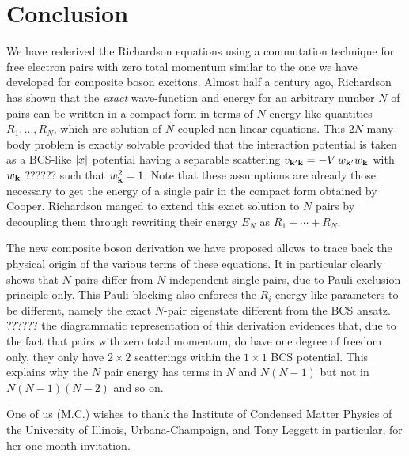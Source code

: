 \section{Conclusion}
We have rederived the Richardson equations using a commutation technique for free electron pairs with zero total momentum similar to the one we have developed for composite boson excitons.  Almost half a century ago, Richardson has shown that the \emph{exact} wave-function and energy for an arbitrary number $N$ of pairs can be written in a compact form in terms of $N$ energy-like quantities $R_1,..., R_N$, which are solution of $N$ coupled non-linear equations.  This $2N$ many-body problem is exactly solvable provided that the interaction potential is taken as a BCS-like $\lvert{x}\rvert$ potential having a separable scattering $v_{\mathbf{k}'\mathbf{k}}=-V\,w_{\mathbf{k}'}w_{\mathbf{k}}$ with $w_{\mathbf{k}}$ ?????? such that $w_{\mathbf{k}}^2=1$.  Note that these assumptions are already those necessary to get the energy of a single pair in the compact form obtained by Cooper.  Richardson manged to extend this exact solution to $N$ pairs by decoupling them through rewriting their energy $E_N$ as $R_1+\cdots+R_N$.

The new composite boson derivation we have proposed allows to trace back the physical origin of the various terms of these equations.  It in particular clearly shows that $N$ pairs differ from $N$ independent single pairs, due to Pauli exclusion principle only.  This Pauli blocking also enforces the $R_i$ energy-like parameters to be different, namely the exact $N$-pair eigenstate different from the BCS ansatz.  ?????? the diagrammatic representation of this derivation evidences that, due to the fact that pairs with zero total momentum, do have one degree of freedom only, they only have $2\times2$ scatterings within the $1\times1$ BCS potential. This explains why the $N$ pair energy has terms in $N$ and $N(N-1)$ but not in $N(N-1)(N-2)$ and so on.

One of us (M.C.) wishes to thank the Institute of Condensed Matter Physics of the University of Illinois, Urbana-Champaign, and Tony Leggett in particular, for her one-month invitation.  
